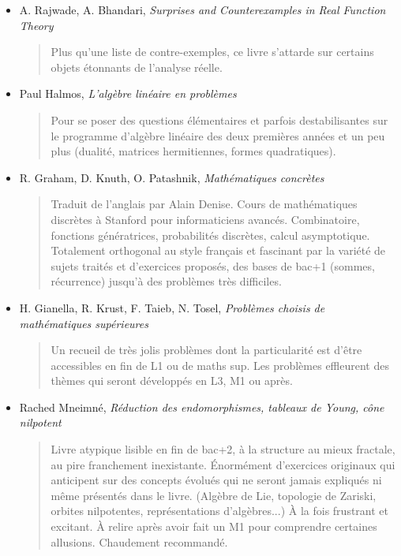 \documentclass{article}
\begin{document}
\begin{itemize}
\item A. Rajwade, A. Bhandari, \emph{Surprises and Counterexamples in Real Function Theory}
\begin{quote}
Plus qu'une liste de contre-exemples, ce livre s'attarde sur certains objets étonnants de l'analyse réelle. 
\end{quote}
\item Paul Halmos, \emph{L'algèbre linéaire en problèmes}
\begin{quote}
Pour se poser des questions élémentaires et parfois destabilisantes sur le programme d'algèbre linéaire des deux premières années et un peu plus (dualité, matrices hermitiennes, formes quadratiques).
\end{quote}
\item R. Graham, D. Knuth, O. Patashnik, \emph{Mathématiques concrètes}
\begin{quote}
Traduit de l'anglais par Alain Denise. Cours de mathématiques discrètes à  Stanford pour informaticiens avancés. Combinatoire, fonctions génératrices, probabilités discrètes, calcul asymptotique. Totalement orthogonal au style français et fascinant par la variété de sujets traités et d'exercices proposés, des bases de bac+1 (sommes, récurrence) jusqu'à des problèmes très difficiles.
\end{quote}
\item  H. Gianella, R. Krust, F. Taieb, N. Tosel, \emph{Problèmes choisis de mathématiques supérieures}
\begin{quote}
Un recueil de très jolis problèmes dont la particularité est d'être accessibles en fin de L1 ou de maths sup. Les problèmes effleurent des thèmes qui seront développés en L3, M1 ou après. %
\end{quote}
\item  Rached Mneimné, \emph{Réduction des endomorphismes, tableaux de Young, cône nilpotent}
\begin{quote}
Livre atypique lisible en fin de bac+2, à la structure au mieux fractale, au pire franchement inexistante. Énormément d'exercices originaux qui anticipent sur des concepts évolués qui ne seront jamais expliqués ni même présentés dans le livre. (Algèbre de Lie, topologie de Zariski, orbites nilpotentes, représentations d'algèbres...) À la fois frustrant et excitant. À relire après avoir fait un M1 pour comprendre certaines allusions. Chaudement recommandé.
\end{quote}

\end{itemize}
\end{document}
